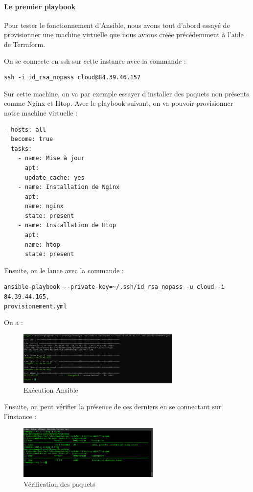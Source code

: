 \documentclass[]{article}
\let\oldparagraph\paragraph
\renewcommand{\paragraph}[1]{\oldparagraph{#1}\mbox{}}
\begin{document}
\paragraph{Le premier playbook}\label{le-premier-playbook}
Pour tester le fonctionnement d'Ansible, nous avons tout d'abord essayé
de provisionner une machine virtuelle que nous avions créée précédemment
à l'aide de Terraform. 

On se connecte en ssh sur cette instance avec la commande :
\begin{verbatim}
ssh -i id_rsa_nopass cloud@84.39.46.157
\end{verbatim}

Sur cette machine, on va par exemple essayer d'installer des paquets non
présents comme Nginx et Htop. Avec le playbook suivant, on va pouvoir
provisionner notre machine virtuelle :
\begin{verbatim}
- hosts: all
  become: true
  tasks:
    - name: Mise à jour 
      apt:
      update_cache: yes
    - name: Installation de Nginx
      apt:
      name: nginx
      state: present
    - name: Installation de Htop
      apt:
      name: htop
      state: present
\end{verbatim}

Ensuite, on le lance avec la commande :
\begin{verbatim}
ansible-playbook --private-key=~/.ssh/id_rsa_nopass -u cloud -i 84.39.44.165, 
provisionement.yml
\end{verbatim}
On a :
\begin{figure}
\centering
\includegraphics[height=100px]{Images/application.png}
\caption{Exécution Ansible}
\end{figure}
Ensuite, on peut vérifier la présence de ces derniers en se connectant
sur l'instance :
\begin{figure}
\centering
\includegraphics[height=100px]{Images/verification.png}
\caption{Vérification des paquets}
\end{figure}
\end{document}
